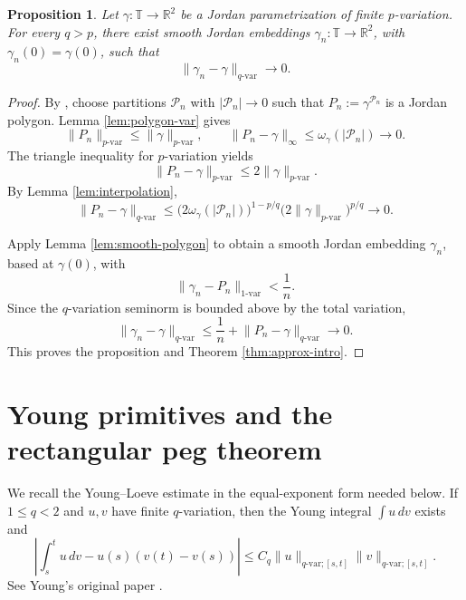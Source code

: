 \documentclass[11pt,reqno]{amsart}
\newtheorem{proposition}[theorem]{Proposition}
\theoremstyle{definition}
\theoremstyle{remark}
\newcommand{\R}{\mathbb{R}}
\newcommand{\T}{\mathbb{T}}
\begin{document}
\begin{proposition}
\label{prop:smooth-approx}
Let \(\gamma\colon\T\to\R^2\) be a Jordan parametrization of finite
\(p\)-variation.  For every \(q>p\), there exist smooth Jordan embeddings
\(\gamma_n\colon\T\to\R^2\), with \(\gamma_n(0)=\gamma(0)\), such that
\begin{equation}\label{eq:qvar-convergence}
 \lVert\gamma_n-\gamma\rVert_{q\text{-var}}\longrightarrow0.
\end{equation}
\end{proposition}

\begin{proof}
By \cite[Theorem~2.2]{BoedihardjoGeng2015}, choose partitions
\(\mathcal P_n\) with \(|\mathcal P_n|\to0\) such that
\(P_n:=\gamma^{\mathcal P_n}\) is a Jordan polygon.  Lemma
\ref{lem:polygon-var} gives
\[
 \lVert P_n\rVert_{p\text{-var}}
 \leq\lVert\gamma\rVert_{p\text{-var}},
 \qquad
 \lVert P_n-\gamma\rVert_\infty
 \leq\omega_\gamma(|\mathcal P_n|)\longrightarrow0.
\]
The triangle inequality for \(p\)-variation yields
\[
 \lVert P_n-\gamma\rVert_{p\text{-var}}
 \leq2\lVert\gamma\rVert_{p\text{-var}}.
\]
By Lemma \ref{lem:interpolation},
\begin{equation}\label{eq:polygon-qvar}
 \lVert P_n-\gamma\rVert_{q\text{-var}}
 \leq
 \bigl(2\omega_\gamma(|\mathcal P_n|)\bigr)^{1-p/q}
 \bigl(2\lVert\gamma\rVert_{p\text{-var}}\bigr)^{p/q}
 \longrightarrow0.
\end{equation}

Apply Lemma \ref{lem:smooth-polygon} to obtain a smooth Jordan embedding
\(\gamma_n\), based at \(\gamma(0)\), with
\[
 \lVert\gamma_n-P_n\rVert_{1\text{-var}}<\frac1n.
\]
Since the \(q\)-variation seminorm is bounded above by the total variation,
\[
 \lVert\gamma_n-\gamma\rVert_{q\text{-var}}
 \leq\frac1n+\lVert P_n-\gamma\rVert_{q\text{-var}}
 \longrightarrow0.
\]
This proves the proposition and Theorem \ref{thm:approx-intro}.
\end{proof}

\section{Young primitives and the rectangular peg theorem}

We recall the Young--Loeve estimate in the equal-exponent form needed below.
If \(1\leq q<2\) and \(u,v\) have finite \(q\)-variation, then the Young
integral \(\int u\,dv\) exists and
\begin{equation}\label{eq:young-loeve}
 \left|
 \int_s^t u\,dv-u(s)(v(t)-v(s))
 \right|
 \leq C_q
 \lVert u\rVert_{q\text{-var};[s,t]}
 \lVert v\rVert_{q\text{-var};[s,t]}.
\end{equation}
See Young's original paper \cite{Young1936}.
\end{document}
